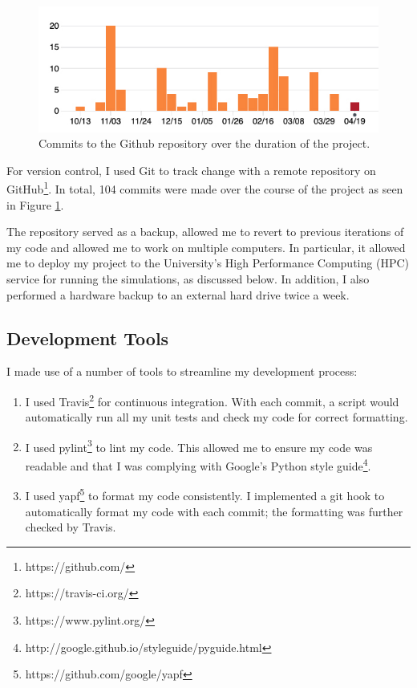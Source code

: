 \documentclass[12pt,a4paper]{report}
\begin{document}
\begin{figure}[ht]
  \centering
  \includegraphics[width=.9\linewidth]{figs/commits.jpg}
  \caption{Commits to the Github repository over the duration of the project.}
  \label{fig:commits}
\end{figure}

For version control, I used Git to track change with a remote repository on GitHub\footnote{https://github.com/}. In total, 104 commits were made over the course of the project as seen in Figure \ref{fig:commits}.

The repository served as a backup, allowed me to revert to previous iterations of my code and allowed me to work on multiple computers. In particular, it allowed me to deploy my project to the University's High Performance Computing (HPC) service for running the simulations, as discussed below. In addition, I also performed a hardware backup to an external hard drive twice a week.

\subsection{Development Tools}

I made use of a number of tools to streamline my development process:

\begin{enumerate}

\item I used Travis\footnote{https://travis-ci.org/} for continuous integration. With each commit, a script would automatically run all my unit tests and check my code for correct formatting.
	
\item I used pylint\footnote{https://www.pylint.org/} to lint my code. This allowed me to ensure my code was readable and that I was complying with Google's Python style guide\footnote{http://google.github.io/styleguide/pyguide.html}.
	
\item I used yapf\footnote{https://github.com/google/yapf} to format my code consistently. I implemented a git hook to automatically format my code with each commit; the formatting was further checked by Travis.
	
\end{enumerate}
\end{document}
